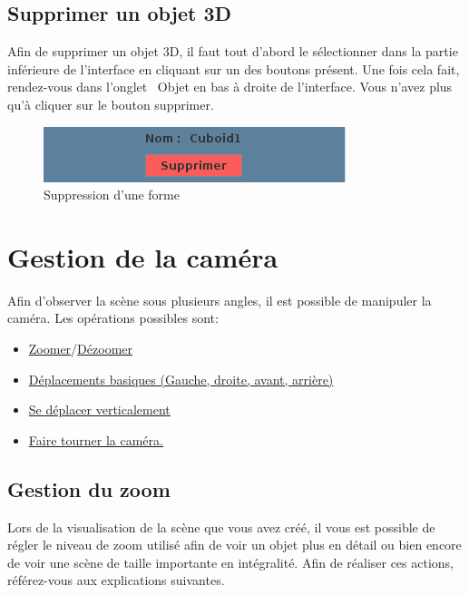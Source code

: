 \documentclass[11pt]{report}
\begin{document}
\section{Supprimer un objet 3D}

Afin de supprimer un objet 3D, il faut tout d'abord le sélectionner dans la partie inférieure de l'interface en cliquant sur un des boutons
présent. Une fois cela fait, rendez-vous dans l'onglet \flqq\ Objet \frqq en bas à droite de l'interface. Vous n'avez plus qu'à cliquer sur le
bouton supprimer.

\begin{figure}[h]
  \centering
  \includegraphics{./supprimer.png}
  \caption{Suppression d'une forme}
\end{figure}

\chapter{Gestion de la caméra}


Afin d'observer la scène sous plusieurs angles, il est possible de manipuler la caméra. Les opérations possibles sont:
\begin{itemize}
        \item \hyperlink{zoom}{Zoomer}/\hyperlink{dezoom}{Dézoomer}
        \item \hyperlink{move}{Déplacements basiques (Gauche, droite, avant, arrière)}
        \item \hyperlink{moveV}{Se déplacer verticalement}
        \item \hyperlink{rotate}{Faire tourner la caméra.}
\end{itemize}

\section{Gestion du zoom}

Lors de la visualisation de la scène que vous avez créé, il vous est possible de régler le niveau de zoom utilisé afin de voir un objet plus en détail ou bien encore de voir une scène de taille importante en intégralité. Afin de réaliser ces actions, référez-vous aux explications suivantes.
\end{document}
